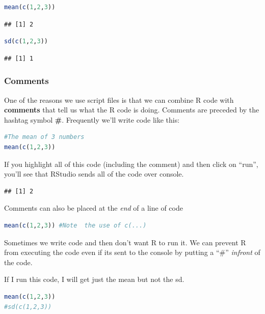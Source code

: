 \documentclass[
]{book}
\begin{document}
\begin{lstlisting}[language=R]
mean(c(1,2,3))
\end{lstlisting}

\begin{lstlisting}
## [1] 2
\end{lstlisting}

\begin{lstlisting}[language=R]
sd(c(1,2,3))
\end{lstlisting}

\begin{lstlisting}
## [1] 1
\end{lstlisting}

\hypertarget{comments}{%
\subsubsection{Comments}\label{comments}}

One of the reasons we use script files is that we can combine R code with \textbf{comments} that tell us what the R code is doing. Comments are preceded by the hashtag symbol \textbf{\#}. Frequently we'll write code like this:

\begin{lstlisting}[language=R]
#The mean of 3 numbers
mean(c(1,2,3))
\end{lstlisting}

If you highlight all of this code (including the comment) and then click on ``run'', you'll see that RStudio sends all of the code over console.

\begin{lstlisting}
## [1] 2
\end{lstlisting}

Comments can also be placed at the \emph{end} of a line of code

\begin{lstlisting}[language=R]
mean(c(1,2,3)) #Note  the use of c(...)
\end{lstlisting}

Sometimes we write code and then don't want R to run it. We can prevent R from executing the code even if its sent to the console by putting a ``\#'' \emph{infront} of the code.

If I run this code, I will get just the mean but not the sd.

\begin{lstlisting}[language=R]
mean(c(1,2,3))
#sd(c(1,2,3))
\end{lstlisting}
\end{document}

